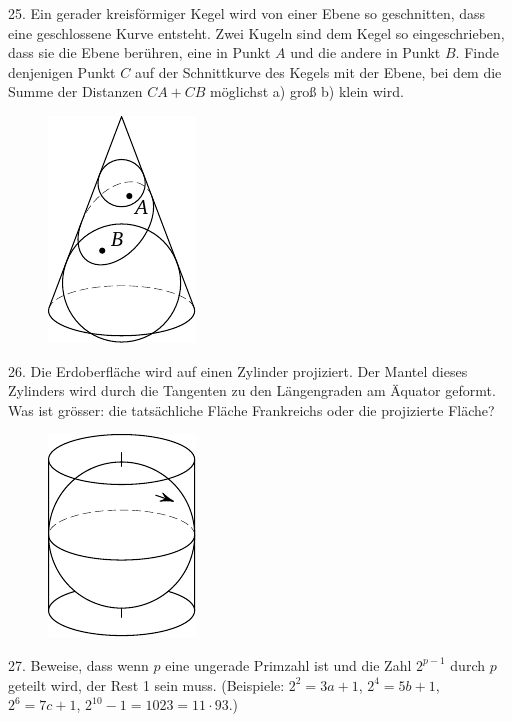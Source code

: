 \begin{problem}{25.}
	Ein gerader kreisförmiger Kegel wird von einer Ebene so geschnitten, dass eine geschlossene Kurve entsteht. Zwei Kugeln sind dem Kegel so eingeschrieben, dass sie die Ebene berühren, eine in Punkt $A$ und die andere in Punkt $B$. Finde denjenigen Punkt $C$ auf der Schnittkurve des Kegels mit der Ebene, bei dem die Summe der Distanzen $CA + CB$ möglichst a) groß b) klein wird. 
	\begin{figure}
		\includegraphics{taskbook-9}
	\end{figure}
\end{problem}

\begin{problem}{26.}
	Die Erdoberfläche wird auf einen Zylinder projiziert. Der Mantel dieses Zylinders wird durch die Tangenten zu den Längengraden am Äquator geformt. Was ist grösser: die tatsächliche Fläche Frankreichs oder die projizierte Fläche?
	\begin{figure}
		\includegraphics{taskbook-10}
	\end{figure}
\end{problem}

\begin{problem}{27.}
	Beweise, dass wenn $p$ eine ungerade Primzahl ist und die Zahl $2^{p-1}$ durch $p$ geteilt wird, der Rest 1 sein muss. (Beispiele: $2^2 = 3a +1$, $2^4 = 5b+1$, $2^6 = 7c+1$, $2^{10} - 1 = 1023 = 11\cdot 93$.) 
\end{problem}

